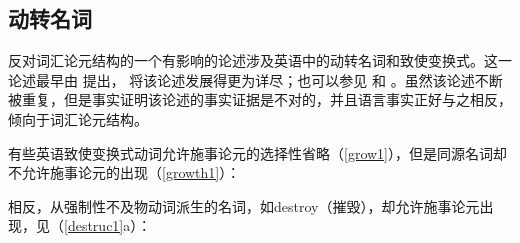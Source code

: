 \subsection{动转名词}
\label{deverbal-sec}

反对词汇论元结构的一个有影响的论述涉及英语中的动转名词和致使变换式。这一论述最早由 \citet{Chomsky70a}提出， \citet{Marantz97a}将该论述发展得更为详尽；也可以参见 \citet{Pesetsky96a-u}和 \citet{HN2000a}。虽然该论述不断被重复，但是事实证明该论述的事实证据是不对的，并且语言事实正好与之相反，倾向于词汇论元结构\citep{Wechsler2008b, Wechsler2008a}。

有些英语致使变换式动词允许施事论元的选择性省略（\ref{grow1}），但是同源名词却不允许施事论元的出现（\ref{growth1}）：

\eal
\label{grow1}
\zl

\eal
\label{growth1}
\zl
%
相反，从强制性不及物动词派生的名词，如destroy（摧毁），却允许施事论元出现，见（\ref{destruc1}a）：

